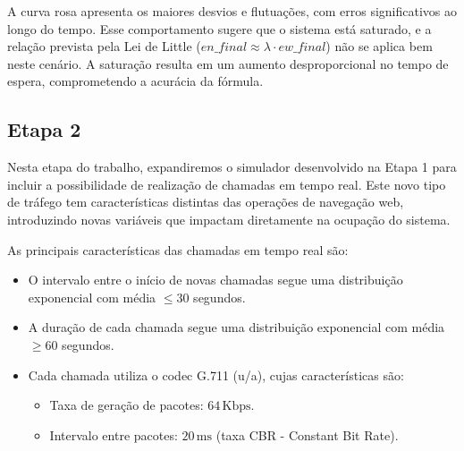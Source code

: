 A curva rosa apresenta os maiores desvios e flutuações, com erros significativos ao longo do tempo. Esse comportamento sugere que o sistema está saturado, e a relação prevista pela Lei de Little (\(en\_final \approx \lambda \cdot ew\_final\)) não se aplica bem neste cenário. A saturação resulta em um aumento desproporcional no tempo de espera, comprometendo a acurácia da fórmula.



\subsection{Etapa 2}
Nesta etapa do trabalho, expandiremos o simulador desenvolvido na Etapa 1 para incluir a possibilidade de realização de chamadas em tempo real. Este novo tipo de tráfego tem características distintas das operações de navegação web, introduzindo novas variáveis que impactam diretamente na ocupação do sistema. 

As principais características das chamadas em tempo real são:
\begin{itemize}
    \item O intervalo entre o início de novas chamadas segue uma distribuição exponencial com média \(\leq 30\) segundos.
    \item A duração de cada chamada segue uma distribuição exponencial com média \(\geq 60\) segundos.
    \item Cada chamada utiliza o codec G.711 (u/a), cujas características são:
    \begin{itemize}
        \item Taxa de geração de pacotes: \(64 \, \text{Kbps}\).
        \item Intervalo entre pacotes: \(20 \, \text{ms}\) (taxa CBR - Constant Bit Rate).
    \end{itemize}
\end{itemize}

